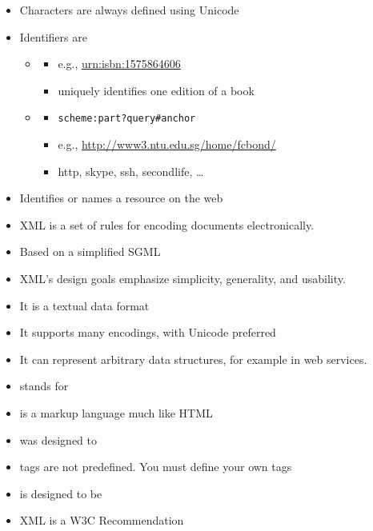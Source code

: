 \documentclass[a4paper,landscape,headrule,footrule,xetex]{foils}
\begin{document}
\begin{itemize}
\item Characters are always defined using Unicode
\item Identifiers are 
  \begin{itemize}
  \item {}
    \begin{itemize}
    \item e.g., \url{urn:isbn:1575864606}
    \item uniquely identifies one edition of a book
    \end{itemize}
  \item {}
    \begin{itemize}
    \item \texttt{scheme:part?query\#anchor}
    \item e.g., \url{http://www3.ntu.edu.sg/home/fcbond/}
    \item http, skype, ssh, secondlife, \ldots
    \end{itemize}
  \end{itemize}
\item Identifies or names a resource on the web
\end{itemize}



\begin{itemize}
\item XML is a set of rules for encoding documents electronically.
\item Based on a simplified SGML
\item XML’s design goals emphasize simplicity, generality, and usability.
\item It is a textual data format
\item It supports many encodings, with Unicode preferred
\item It can represent arbitrary data structures, for example in web services.
\end{itemize}


\begin{itemize}
\item {} stands for 
\item is a markup language much like HTML
\item was designed to 
\item tags are not predefined. You must define your own tags
\item is designed to be 
\item XML is a W3C Recommendation
\end{itemize}
\end{document}
